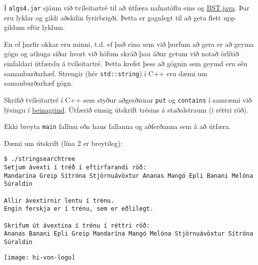 \documentclass{article}
\begin{document}
\question

Í \texttt{algs4.jar} sjáum við tvíleitartré til að útfæra nafnatöflu eins og \href{https://algs4.cs.princeton.edu/code/edu/princeton/cs/algs4/BST.java.html}{BST.java}. Þar eru lyklar  og gildi  aðskilin fyrirbrigði. Þetta er gagnlegt til að geta flett upp gildum eftir lyklum.

En ef þarfir okkar eru minni, t.d. ef það eina sem við þurfum að gera er að geyma gögn og athuga síðar hvort við höfum skráð þau áður getum við notað örlítið einfaldari útfærslu á tvíleitartré. Þetta krefst þess að gögnin sem geymd eru séu samanburðarhæf. Strengir (hér \texttt{std::string}) í C++ eru dæmi um samanburðarhæf gögn. 

Skrifið tvíleitartré í C++ sem styður aðgerðirnar \texttt{put} og \texttt{contains} í samræmi við lýsingu í \href{https://github.com/Ernir/kennsluefni/tree/master/T2/Code/w8/stringsearchtree.cpp}{beinagrind}. Útfærið einnig útskrift trésins á staðalstraum (í réttri röð).

Ekki breyta \texttt{main} fallinu eða haus fallanna og aðferðanna sem á að útfæra. 

\newpage
Dæmi um útskrift (lína 2 er breytileg):
\begin{verbatim}
$ ./stringsearchtree
Setjum ávexti í tréð í eftirfarandi röð:
Mandarína Greip Sítróna Stjörnuávöxtur Ananas Mangó Epli Banani Melóna Súraldin

Allir ávextirnir lentu í trénu.
Engin ferskja er í trénu, sem er eðlilegt.

Skrifum út ávextina í trénu í réttri röð:
Ananas Banani Epli Greip Mandarína Mangó Melóna Stjörnuávöxtur Sítróna Súraldin
\end{verbatim}

\vfill
\texttt{[image: hi-von-logo]}
\end{document}
